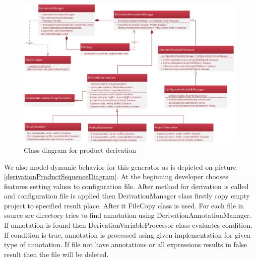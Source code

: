 \documentclass[11pt,slovak,a4paper,twoside]{article}
\begin{document}
\begin{figure}[t]  %
					\begin{center}
									\includegraphics[width=\linewidth]{fig/DerivationClass.png}
									\caption{Class diagram for product derivation}
									\label{derivationProductClassDiagram}
					\end{center}
\end{figure}


We also model dynamic behavior for this generator as is depicted on picture \ref{derivationProductSequenceDiagram}. At the beginning developer chooses features setting values to configuration file. After method for derivation is called and configuration file is applied then DerivationManager class firstly copy empty project to specified result place. After it FileCopy class is used. For each file in source src directory tries to find annotation using DerivationAnnotationManager. If annotation is found then DerivationVariableProcessor class evaluates condition. If condition is true, annotation is processed using given implementation for given type of annotation. If file not have annotations or all expressions results in false result then the file will be deleted.
\end{document}
